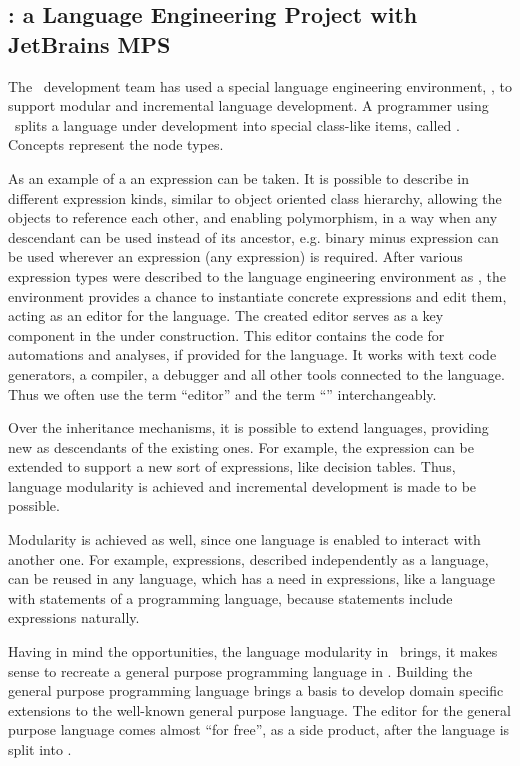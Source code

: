 \subsection{\mbdr: a Language Engineering Project with JetBrains MPS}

The \mbdr\ development team has used a special language engineering environment, , to support modular and incremental 
language development.  A programmer using \jbmps\ splits a language under development into special class-like items, 
called . Concepts represent the  node types. 

As an example of a  an expression can be taken. It is possible to describe in  different 
expression kinds, similar to object oriented class hierarchy, allowing the objects to reference each other, 
and enabling polymorphism, in a way when any descendant can be used instead of its ancestor, e.g. 
binary minus expression can be used wherever an expression (any expression) is required. 
After various expression types were described to the language engineering environment as , 
the environment provides a chance to instantiate concrete expressions and edit them, acting as an editor for 
the language. The created editor serves as a key component in the  under construction. This editor
contains the code for automations and analyses, if provided for the language. It works with text code generators, 
a compiler, a debugger and all other tools connected to the language. Thus we often use the term ``editor'' and 
the term ``'' interchangeably.

Over the inheritance mechanisms, it is possible to extend languages, providing new  as descendants of 
the existing ones. For example, the expression  can be extended to support a new sort of expressions, like decision tables.
Thus, language modularity is achieved and incremental development is made to be possible.

Modularity is achieved as well, since one language is enabled to interact with another one. For example, expressions,
described independently as a language, can be reused in any language, which has a need in expressions, like a language with
statements of a programming language, because statements include expressions naturally.

Having in mind the opportunities, the language modularity in \jbmps\ brings, it makes sense to recreate a general 
purpose programming language in \jbmps. Building the general purpose programming language brings a basis to develop 
domain specific extensions to the well-known general purpose language. The editor for the general purpose language comes 
almost ``for free'', as a side product, after the language is split into .

